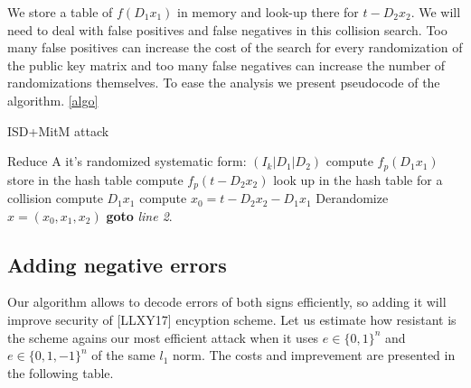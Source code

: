\documentclass[12pt]{article}
\begin{document}
We store a table of $f(D_1x_1)$ in memory and look-up there for $t - D_2x_2$. We will need to deal with false positives and false negatives in this collision search. Too many false positives can increase the cost of the search for every randomization of the public key matrix and too many false negatives can increase the number of randomizations themselves. To ease the analysis we present pseudocode of the algorithm. \ref{algo}


\begin{algorithm}
\caption{ISD+MitM attack}\label{algo}
\begin{algorithmic}[1]
    \State Reduce A it's randomized systematic form: $(I_k |D_1|D_2)$
    \State compute $f_{p}(D_1x_1)$
    \State store in the hash table
    \EndFor
    \State compute $f_{p}(t - D_2x_2)$
    \State look up in the hash table for a collision
        \State compute $D_1x_1$
        \State compute $x_0 = t - D_2x_2 - D_1x_1$
        \State \Return Derandomize $x = (x_0, x_1, x_2)$
        \EndIf
    \EndIf
    \EndFor
\State \textbf{goto} \emph{line 2}.
\EndProcedure
\end{algorithmic}
\end{algorithm}

\subsection{Adding negative errors}
\label{subsec:negative_error_improvement}
Our algorithm allows to decode errors of both signs efficiently, so adding it will improve security of [LLXY17] encyption scheme. Let us estimate how resistant is the scheme agains our most efficient attack when it uses $ e \in \{0,1\}^{n}$ and $ e \in \{0,1,-1\}^{n}$ of the same $l_1$ norm. The costs and imprevement are presented in the following table.\\
\end{document}
